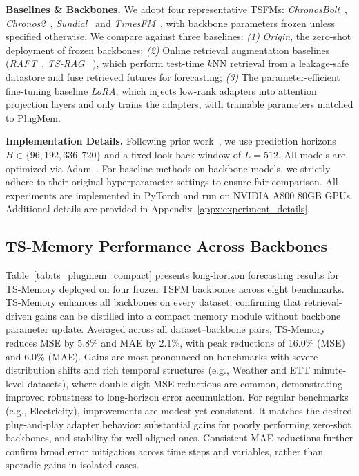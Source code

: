 \noindent\textbf{Baselines \& Backbones.} 
We adopt four representative TSFMs: \textit{ChronosBolt}~\cite{ansari2024chronos}, \textit{Chronos2}~\cite{ansari2025chronos}, \textit{Sundial}~\cite{liu2025sundial} and \textit{TimesFM}~\cite{das2024decoder}, with backbone parameters frozen unless specified otherwise. 
We compare against three baselines: 
\textit{(1)} \textit{Origin}, the zero-shot deployment of frozen backbones; 
\textit{(2)} Online retrieval augmentation baselines (\textit{RAFT}~\cite{han2025retrieval}, \textit{TS-RAG}~
\cite{ning2025ts}), which perform test-time $k$NN retrieval from a leakage-safe datastore and fuse retrieved futures for forecasting; 
\textit{(3)} The parameter-efficient fine-tuning baseline \textit{LoRA}, which injects low-rank adapters into attention projection layers and only trains the adapters, with trainable parameters matched to PlugMem.

\noindent\textbf{Implementation Details.} Following prior work~\cite{wu2023timesnet}, we use prediction horizons $H \in \{96, 192, 336, 720\}$ and a fixed look-back window of $L = 512$. All models are optimized via Adam~\cite{kingma2014adam}. For baseline methods on backbone models, we strictly adhere to their original hyperparameter settings to ensure fair comparison. All experiments are implemented in PyTorch and run on NVIDIA A800 80GB GPUs. Additional details are provided in Appendix~\ref{appx:experiment_details}.




\subsection{TS-Memory Performance Across Backbones}
\label{sec:ts_memory_perf_backbones}

Table~\ref{tab:ts_plugmem_compact} presents long-horizon forecasting results for TS-Memory deployed on four frozen TSFM backbones across eight benchmarks. TS-Memory enhances all backbones on every dataset, confirming that retrieval-driven gains can be distilled into a compact memory module without backbone parameter update. Averaged across all dataset–backbone pairs, TS-Memory reduces MSE by 5.8\% and MAE by 2.1\%, with peak reductions of 16.0\% (MSE) and 6.0\% (MAE). Gains are most pronounced on benchmarks with severe distribution shifts and rich temporal structures (e.g., Weather and ETT minute-level datasets), where double-digit MSE reductions are common, demonstrating improved robustness to long-horizon error accumulation. For regular benchmarks (e.g., Electricity), improvements are modest yet consistent. It matches the desired plug-and-play adapter behavior: substantial gains for poorly performing zero-shot backbones, and stability for well-aligned ones. Consistent MAE reductions further confirm broad error mitigation across time steps and variables, rather than sporadic gains in isolated cases.

